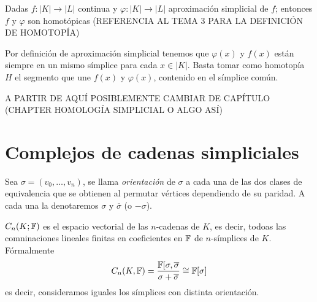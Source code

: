 \documentclass[HS.tex]{subfiles}
\begin{document}
\begin{prop}
Dadas $f:|K|\to|L|$ continua y $\varphi:|K|\to |L|$ aproximación simplicial de $f$; entonces $f$ y $\varphi$ son homotópicas (REFERENCIA AL TEMA 3 PARA LA DEFINICIÓN DE HOMOTOPÍA)
\end{prop}
\begin{dem}
Por definición de aproximación simplicial tenemos que $\varphi(x)$ y $f(x)$ están siempre en un mismo símplice para cada $x\in|K|$. Basta tomar como homotopía $H$ el segmento que une $f(x)$ y $\varphi(x)$, contenido en el símplice común. 
\QED
\end{dem}


A PARTIR DE AQUÍ POSIBLEMENTE CAMBIAR DE CAPÍTULO (CHAPTER HOMOLOGÍA SIMPLICIAL O ALGO ASÍ)

\section{Complejos de cadenas simpliciales}

\begin{defi}
Sea $\sigma=(v_0,\dots, v_n)$, se llama \emph{orientación} de $\sigma$ a cada una de las dos clases de equivalencia que se obtienen al permutar vértices dependiendo de su paridad. A cada una la denotaremos $\sigma$ y $\overline{\sigma}$ (o $-\sigma$).
\end{defi}

\begin{defi}
$C_n(K;\mathbb{F})$ es el espacio vectorial de las $n$-cadenas  de $K$, es decir, todoas las comninaciones lineales finitas en coeficientes en $\mathbb{F}$ de $n$-símplices de $K$. Fórmalmente
\[
C_n(K,\mathbb{F})=\frac{\mathbb{F}[\sigma,\overline{\sigma}}{\sigma+\overline{\sigma}}\cong \mathbb{F}[\sigma]
\]
es decir, consideramos iguales los símplices con distinta orientación.
\end{defi}
\end{document}
